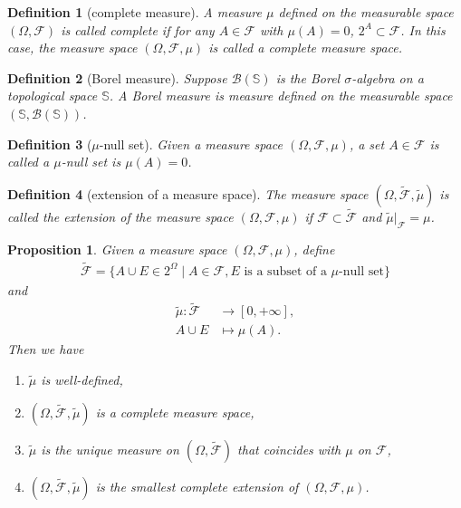 \documentclass{report}
\newtheorem{definition}{Definition}[section]
\newtheorem{proposition}{Proposition}[section]
\theoremstyle{nonumberplain}
\begin{document}
\begin{definition}[complete measure]
	A measure $\mu$ defined on the measurable space $(\Omega,\mathcal{F})$ is called \emph{complete} if for any $A \in \mathcal{F}$ with $\mu(A) = 0$, $2^A \subset \mathcal{F}$. In this case, the measure space $(\Omega,\mathcal{F},\mu)$ is called a complete measure space. 
\end{definition}

\begin{definition}[Borel measure]
	Suppose $\mathcal{B}(\mathbb{S})$ is the Borel $\sigma$-algebra on a topological space $\mathbb{S}$. A \emph{Borel measure} is measure defined on the measurable space $(\mathbb{S},\mathcal{B}(\mathbb{S}))$.
\end{definition}

\begin{definition}[$\mu$-null set]
	Given a measure space $(\Omega, \mathcal{F}, \mu)$, a set $A\in  \mathcal{F}$ is called a $\mu$-null set is $\mu(A)=0$.
\end{definition}

\begin{definition}[extension of a measure space]
	The measure space $(\Omega, \widetilde{\mathcal{F}}, \widetilde{\mu})$ is called the extension of the measure space $(\Omega, \mathcal{F}, \mu)$ if $\mathcal{F}\subset\widetilde{\mathcal{F}}$ and $\widetilde{\mu}|_{\mathcal{F}}=\mu$.
\end{definition}

\begin{proposition}
	Given a measure space $(\Omega, \mathcal{F}, \mu)$, define
	\begin{align*}
		\widetilde{\mathcal{F}}=\{A\cup E\in 2^\Omega\mid A\in\mathcal{F},E\text{ is a subset of a $\mu$-null set} \}
	\end{align*}
	and
	\begin{align*}
		\widetilde{\mu}:\widetilde{\mathcal{F}}&\longrightarrow[0,+\infty],\\
		A\cup E&\longmapsto \mu(A).
	\end{align*}
Then we have
\begin{enumerate}[(1)]
	\item $\widetilde{\mu}$ is well-defined,
	\item $(\Omega, \widetilde{\mathcal{F}}, \widetilde{\mu})$ is a complete measure space,
	\item $\widetilde{\mu}$ is the unique measure on $(\Omega, \widetilde{\mathcal{F}})$ that coincides with $\mu$ on $\mathcal{F}$,
	\item $(\Omega, \widetilde{\mathcal{F}}, \widetilde{\mu})$ is the smallest complete extension of $(\Omega, \mathcal{F}, \mu)$.
\end{enumerate}
\end{proposition}
\end{document}
